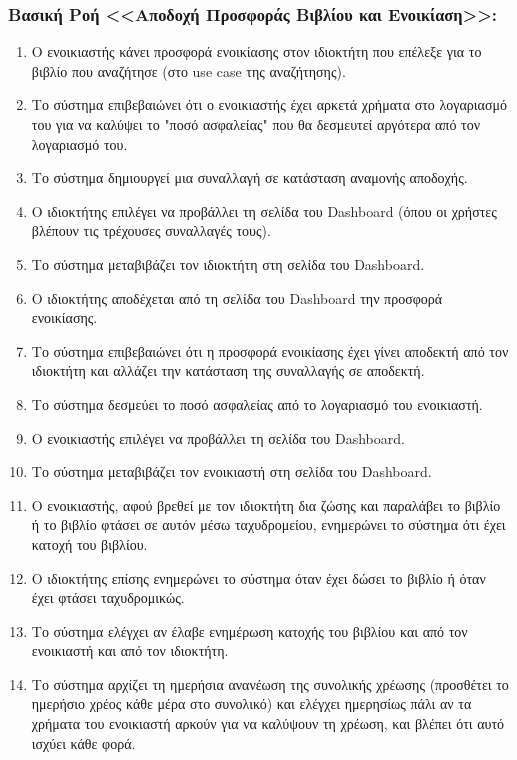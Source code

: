 \documentclass[12pt,a4paper]{article}
\begin{document}
\subsubsection*{Βασική Ροή <<Αποδοχή Προσφοράς Βιβλίου και Ενοικίαση>>:}
\begin{enumerate}
    \item Ο ενοικιαστής κάνει προσφορά ενοικίασης στον ιδιοκτήτη που επέλεξε για το βιβλίο που αναζήτησε (στο use case της αναζήτησης).
        \label{Επιλογή τρόπου συναλλαγής}
    \item Το σύστημα επιβεβαιώνει ότι ο ενοικιαστής έχει αρκετά χρήματα στο λογαριασμό του για να καλύψει το "ποσό ασφαλείας" που θα δεσμευτεί αργότερα από τον λογαριασμό του.
        \label{Έλεγχος ποσού ασφαλείας}
    \item Το σύστημα δημιουργεί μια συναλλαγή σε κατάσταση αναμονής αποδοχής.
    \item Ο ιδιοκτήτης επιλέγει να προβάλλει τη σελίδα του Dashboard (όπου οι χρήστες βλέπουν τις τρέχουσες συναλλαγές τους).
    \item Το σύστημα μεταβιβάζει τον ιδιοκτήτη στη σελίδα του Dashboard.
    \item Ο ιδιοκτήτης αποδέχεται από τη σελίδα του Dashboard την προσφορά ενοικίασης.
    \item Το σύστημα επιβεβαιώνει ότι η προσφορά ενοικίασης έχει γίνει αποδεκτή από τον ιδιοκτήτη και αλλάζει την κατάσταση της συναλλαγής σε αποδεκτή.
        \label{Αποδοχή ή απόρριψη συναλλαγής}
    \item Το σύστημα δεσμεύει το ποσό ασφαλείας από το λογαριασμό του ενοικιαστή.
    \item Ο ενοικιαστής επιλέγει να προβάλλει τη σελίδα του Dashboard.
    \item Το σύστημα μεταβιβάζει τον ενοικιαστή στη σελίδα του Dashboard.
    \item Ο ενοικιαστής, αφού βρεθεί με τον ιδιοκτήτη δια ζώσης και παραλάβει το βιβλίο ή το βιβλίο φτάσει σε αυτόν μέσω ταχυδρομείου, ενημερώνει το σύστημα ότι έχει κατοχή του βιβλίου. 
    \item Ο ιδιοκτήτης επίσης ενημερώνει το σύστημα όταν έχει δώσει το βιβλίο ή όταν έχει φτάσει ταχυδρομικώς.
    \item Το σύστημα ελέγχει αν έλαβε ενημέρωση κατοχής του βιβλίου και από τον ενοικιαστή και από τον ιδιοκτήτη.
        \label {Δεν ενημερώνεται η κατοχή}
    \item Το σύστημα αρχίζει τη ημερήσια ανανέωση της συνολικής χρέωσης (προσθέτει το ημερήσιο χρέος κάθε μέρα στο συνολικό) και ελέγχει ημερησίως πάλι αν τα χρήματα του ενοικιαστή αρκούν για να καλύψουν τη χρέωση, και βλέπει ότι αυτό ισχύει κάθε φορά.

\end{enumerate}
\end{document}
